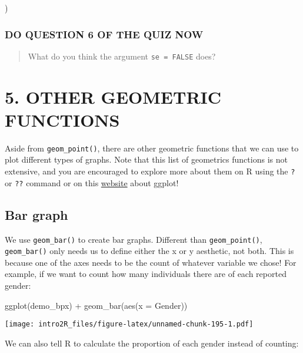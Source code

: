 \documentclass[
]{book}
\newenvironment{Shaded}{\begin{snugshade}}{\end{snugshade}}
\newcommand{\AttributeTok}[1]{\textcolor[rgb]{0.77,0.63,0.00}{#1}}
\newcommand{\FunctionTok}[1]{\textcolor[rgb]{0.00,0.00,0.00}{#1}}
\newcommand{\NormalTok}[1]{#1}
\newcommand{\SpecialCharTok}[1]{\textcolor[rgb]{0.00,0.00,0.00}{#1}}
\begin{document}
)

\hypertarget{do-question-6-of-the-quiz-now-1}{%
\subsubsection{DO QUESTION 6 OF THE QUIZ NOW}\label{do-question-6-of-the-quiz-now-1}}

\begin{quote}
What do you think the argument \texttt{se\ =\ FALSE} does?
\end{quote}

\hypertarget{other-geometric-functions}{%
\section{5. OTHER GEOMETRIC FUNCTIONS}\label{other-geometric-functions}}

Aside from \texttt{geom\_point()}, there are other geometric functions that we can use to plot different types of graphs. Note that this list of geometrics functions is not extensive, and you are encouraged to explore more about them on R using the \texttt{?} or \texttt{??} command or on this \href{https://ggplot2.tidyverse.org/reference/}{website} about ggplot!

\hypertarget{bar-graph}{%
\subsection{Bar graph}\label{bar-graph}}

We use \texttt{geom\_bar()} to create bar graphs. Different than \texttt{geom\_point()}, \texttt{geom\_bar()} only needs us to define either the x or y aesthetic, not both. This is because one of the axes needs to be the count of whatever variable we chose! For example, if we want to count how many individuals there are of each reported gender:

\begin{Shaded}
\begin{Highlighting}[]
\FunctionTok{ggplot}\NormalTok{(demo\_bpx) }\SpecialCharTok{+}
    \FunctionTok{geom\_bar}\NormalTok{(}\FunctionTok{aes}\NormalTok{(}\AttributeTok{x =}\NormalTok{ Gender))}
\end{Highlighting}
\end{Shaded}

\texttt{[image: intro2R\_files/figure-latex/unnamed-chunk-195-1.pdf]}

We can also tell R to calculate the proportion of each gender instead of counting:
\end{document}
